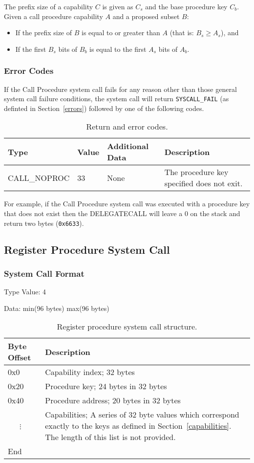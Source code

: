 \documentclass[english,a4paper]{article}
\let\oldparagraph\subsubsection
\renewcommand{\subsubsection}[1]{\oldparagraph{#1}\mbox{}}
\begin{document}
The prefix size of a capability $C$ is given as $C_s$ and the base procedure key
$C_b$. Given a call procedure capability $A$ and a proposed subset $B$:
\begin{itemize}
  \item If the prefix size of $B$ is equal to or greater than $A$ (that is: $B_s
  \geq A_s$), and
  \item If the first $B_s$ bits of $B_b$ is equal to the first $A_s$ bits of
  $A_b$.
\end{itemize}

\subsubsection{Error Codes}
If the Call Procedure system call fails for any reason other than those
general system call failure conditions, the system call will return
\texttt{SYSCALL\_FAIL} (as definted in Section~\ref{errors}) followed by one of
the following codes.

\begin{table}[H]
  \caption{Return and error codes.}
  \centering{}%
  \begin{tabular}{l|l|p{}|p{}}
    \hline
    Type & Value & Additional Data & Description\tabularnewline
    \hline
    \hline
    CALL\_NOPROC  & 33 & None & The procedure key specified does not exit.
      \tabularnewline
    \hline
  \end{tabular}
\end{table}

For example, if the Call
Procedure system call was executed with a procedure key that does not exist then
the DELEGATECALL will leave a 0 on the stack and return two bytes
(\texttt{0x6633}).

\subsection{Register Procedure System Call}

\subsubsection{System Call Format}
Type Value: 4

Data: min(96 bytes) max(96 bytes)

\begin{table}[H]
  \caption{Register procedure system call structure.}
  \centering{}%
  \begin{tabular}{l|p{}}
    \hline
    Byte Offset & Description\tabularnewline
    \hline
    \hline
    0x0 & Capability index; 32 bytes \tabularnewline
    0x20 & Procedure key; 24 bytes in 32 bytes \tabularnewline
    0x40 & Procedure address; 20 bytes in 32 bytes \tabularnewline
    ~~~$\vdots$ & Capabilities; A series of 32 byte values which correspond
    exactly to the keys as defined in Section~\ref{capabilities}. The length of
    this list is not provided. \tabularnewline
    \hline
    End &  \tabularnewline
    \hline
  \end{tabular}
\end{table}
\end{document}
